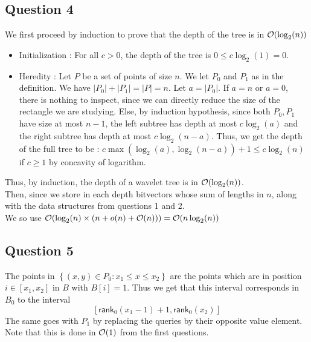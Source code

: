 \documentclass{cours}
\begin{document}
\subsection{Question 4}
We first proceed by induction to prove that the depth of the tree is in $\mathcal{O}(\log_{2}(n))$
\begin{itemize}
    \item Initialization : For all $c > 0$, the depth of the tree is $0 \leq c\log_{2}(1) = 0$.
    \item Heredity : Let $P$ be a set of points of size $n$. 
    We let $P_0$ and $P_{1}$ as in the definition. We have $\left|P_{0}\right| + \left|P_{1}\right| = \left|P\right| = n$. Let $a =\left|P_{0}\right|$. 
    If $a = n$ or $a = 0$, there is nothing to inspect, since we can directly reduce the size of the rectangle we are studying. Else, by induction hypothesis, since both $P_{0}, P_{1}$ have size at most $n - 1$, the left subtree has depth at most $c\log_{2}(a)$ and the right subtree has depth at most $c \log_{2}(n-a)$. Thus, we get the depth of the full tree to be : $c\max(\log_{2}(a), \log_{2}(n-a)) + 1 \leq c\log_{2}(n)$ if $c \geq 1$ by concavity of logarithm.
\end{itemize}
Thus, by induction, the depth of a wavelet tree is in $\mathcal{O}(\log_{2}(n))$. \\

Then, since we store in each depth bitvectors whose sum of lengths in $n$, along with the data structures from questions 1 and 2. \\
We so use $\mathcal{O}(\log_{2}(n)\times (n + o(n) + \mathcal{O}(n))) = \mathcal{O}(n\log_{2}(n))$

\subsection{Question 5}
The points in $\left\{(x, y) \in P_{0} : x_{1} \leq x \leq x_{2}\right\}$ are the points which are in position $i \in \left[x_{1}, x_{2}\right]$ in $B$ with $B[i] = 1$. Thus we get that this interval corresponds in $B_{0}$ to the interval \[\left[\textsf{rank}_{0}(x_{1} - 1) + 1, \textsf{rank}_{0}(x_{2})\right]\]
The same goes with $P_{1}$ by replacing the queries by their opposite value element. Note that this is done in $\mathcal{O}(1)$ from the first questions. 
\end{document}
